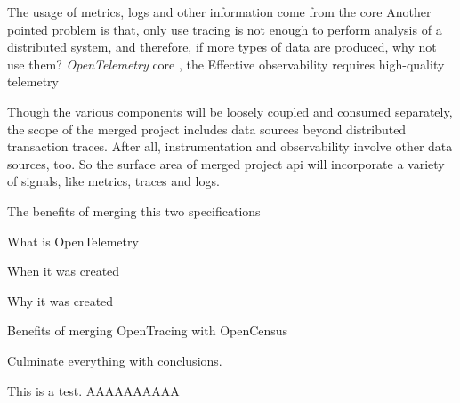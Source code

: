 The usage of metrics, logs and other information come from the core 
Another pointed problem is that, only use tracing is not enough to perform analysis of a distributed system, and therefore, if more types of data are produced, why not use them? \emph{OpenTelemetry} core , the  Effective observability requires high-quality telemetry

Though the various components will be loosely coupled and consumed separately, the scope of the merged project includes data sources beyond distributed transaction traces. After all, instrumentation and observability involve other data sources, too. So the surface area of merged project \gls{api} will incorporate a variety of signals, like metrics, traces and logs.

The benefits of merging this two specifications 




What is OpenTelemetry

When it was created

Why it was created

Benefits of merging OpenTracing with OpenCensus

Culminate everything with conclusions.

This is a test. AAAAAAAAAA

\checkoddpage
{}
{ %
\newpage
\blankpage}
{ %
}